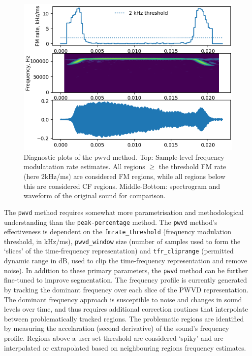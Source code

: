 \documentclass[
]{book}
\begin{document}
\begin{figure}
\includegraphics[width=1\linewidth]{original_papers/itsfm-paper/figures/pwvd_fmrate_diagnostic} \caption{Diagnostic plots of the pwvd method. Top: Sample-level frequency modulatation rate estimates. All regions $\geq$ the threshold FM rate (here 2kHz/ms) are considered FM regions, while all regions below this are considered CF regions. Middle-Bottom: spectrogram and waveform of the original sound for comparison.}\label{fig:fmratediags}
\end{figure}

The \texttt{pwvd} method requires somewhat more parametrisation and methodological understanding than the \texttt{peak-percentage} method. The \texttt{pwvd} method's effectiveness is dependent on the \texttt{fmrate\_threshold} (frequency modulation threshold, in kHz/ms), \texttt{pwvd\_window} size (number of samples used to form the `slices' of the time-frequency representation) and \texttt{tfr\_cliprange} (permitted dynamic range in dB, used to clip the time-frequency representation and remove noise). In addition to these primary parameters, the \texttt{pwvd} method can be further fine-tuned to improve segmentation. The frequency profile is currently generated by tracking the dominant frequency over each slice of the PWVD representation. The dominant frequency approach is susceptible to noise and changes in sound levels over time, and thus requires additional correction routines that interpolate between problematically tracked regions. The problematic regions are identified by measuring the accelaration (second derivative) of the sound's frequency profile. Regions above a user-set threshold are considered `spiky' and are interpolated or extrapolated based on neighbouring regions frequency estimates.
\end{document}
